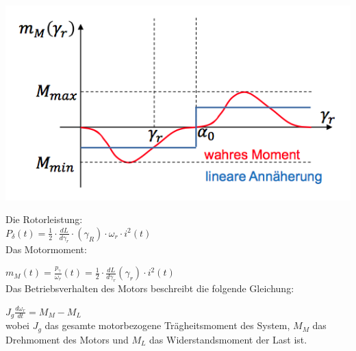 \begin{minipage}{0.5 \linewidth}
\includegraphics[width = \linewidth]{./Pics/VL67/Drehmoment5}
\end{minipage}
\begin{minipage}{0.5 \linewidth}
Die Rotorleistung: \\

$P_\delta (t) = \frac{1}{2} \cdot \frac{dL}{d\gamma_r}\cdot(\gamma_R) \cdot \omega_r \cdot i^2(t)$ \\

Das Motormoment: 

$m_M(t) = \frac{p_\gamma}{\omega_r}(t) = \frac{1}{2} \cdot \frac{dL}{d\gamma_r}(\gamma_r) \cdot i^2(t)$\\

Das Betriebsverhalten des Motors beschreibt die folgende Gleichung: 

$J_g \frac{d\omega_r}{dt} = M_M - M_L $\\

wobei $J_g$ das gesamte motorbezogene Trägheitsmoment des System, $M_M$ das Drehmoment des Motors und $M_L$ das Widerstandsmoment der Last ist.\\
\end{minipage}

